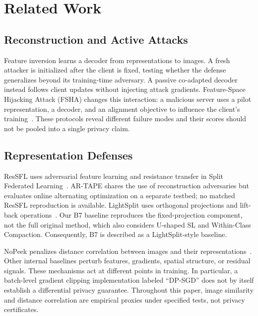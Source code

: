 \section{Related Work}
\subsection{Reconstruction and Active Attacks}
Feature inversion learns a decoder from representations to images. A fresh attacker is initialized after the client is fixed, testing whether the defense generalizes beyond its training-time adversary. A passive co-adapted decoder instead follows client updates without injecting attack gradients. Feature-Space Hijacking Attack (FSHA) changes this interaction: a malicious server uses a pilot representation, a decoder, and an alignment objective to influence the client's training~\cite{pasquini2021fsha}. These protocols reveal different failure modes and their scores should not be pooled into a single privacy claim.

\subsection{Representation Defenses}
ResSFL uses adversarial feature learning and resistance transfer in Split Federated Learning~\cite{li2022ressfl}. AR-TAPE shares the use of reconstruction adversaries but evaluates online alternating optimization on a separate testbed; no matched ResSFL reproduction is available. LightSplit uses orthogonal projections and lift-back operations~\cite{cihangiroglu2026lightsplit}. Our B7 baseline reproduces the fixed-projection component, not the full original method, which also considers U-shaped SL and Within-Class Compaction. Consequently, B7 is described as a LightSplit-style baseline.

NoPeek penalizes distance correlation between images and their representations~\cite{vepakomma2020nopeek}. Other internal baselines perturb features, gradients, spatial structure, or residual signals. These mechanisms act at different points in training. In particular, a batch-level gradient clipping implementation labeled ``DP-SGD'' does not by itself establish a differential privacy guarantee. Throughout this paper, image similarity and distance correlation are empirical proxies under specified tests, not privacy certificates.
